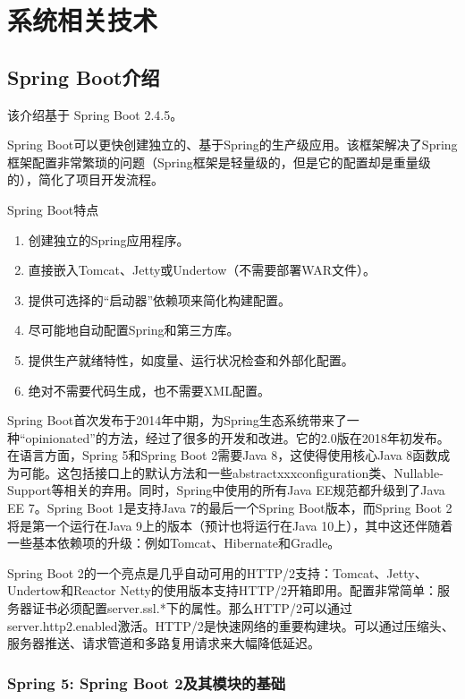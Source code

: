 
\chapter{系统相关技术}
\label{系统相关技术}

\section{Spring Boot介绍}

该介绍基于 Spring Boot 2.4.5。

Spring Boot可以更快创建独立的、基于Spring的生产级应用。该框架解决了Spring框架配置非常繁琐的问题（Spring框架是轻量级的，但是它的配置却是重量级的），简化了项目开发流程\cite{.2019f}。

Spring Boot特点

\begin{enumerate}
  \item 创建独立的Spring应用程序。
  \item 直接嵌入Tomcat、Jetty或Undertow（不需要部署WAR文件）。
  \item 提供可选择的“启动器”依赖项来简化构建配置。
  \item 尽可能地自动配置Spring和第三方库。
  \item 提供生产就绪特性，如度量、运行状况检查和外部化配置。
  \item 绝对不需要代码生成，也不需要XML配置。
\end{enumerate}

Spring Boot首次发布于2014年中期，为Spring生态系统带来了一种“opinionated”的方法，经过了很多的开发和改进。它的2.0版在2018年初发布。 在语言方面，Spring 5和Spring Boot 2需要Java 8，这使得使用核心Java 8函数成为可能。这包括接口上的默认方法和一些abstractxxxconfiguration类、Nullable-Support等相关的弃用。同时，Spring中使用的所有Java EE规范都升级到了Java EE 7。Spring Boot 1是支持Java 7的最后一个Spring Boot版本，而Spring Boot 2将是第一个运行在Java 9上的版本（预计也将运行在Java 10上），其中这还伴随着一些基本依赖项的升级：例如Tomcat、Hibernate和Gradle。

Spring Boot 2的一个亮点是几乎自动可用的HTTP/2支持：Tomcat、Jetty、Undertow和Reactor Netty的使用版本支持HTTP/2开箱即用。配置非常简单：服务器证书必须配置server.ssl.*下的属性。那么HTTP/2可以通过server.http2.enabled激活。HTTP/2是快速网络的重要构建块。可以通过压缩头、服务器推送、请求管道和多路复用请求来大幅降低延迟。

\subsection{Spring 5: Spring Boot 2及其模块的基础}

